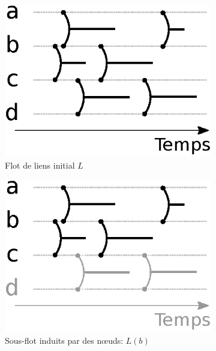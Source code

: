 \begin{figure}[]
\centering
	\begin{subfigure}{0.25\linewidth}
		\includegraphics[width=\linewidth]{img/Intro/sous_flots.eps}\hfill
		\caption{Flot de liens initial $L$}
		\label{fig:exemple_sous_flot_init}	
	\end{subfigure}\hspace{0.1\linewidth}
	\begin{subfigure}{0.25\linewidth}
		\includegraphics[width=\linewidth]{img/Intro/sous_flots1.eps}\hfill
		\caption{Sous-flot induits par des n\oe uds: $L(b)$}	
		\label{fig:exemple_sous_flot1}	
	\end{subfigure}\hspace{0.1\linewidth}
	\begin{subfigure}{0.25\linewidth}

\end{subfigure}
\end{figure}
